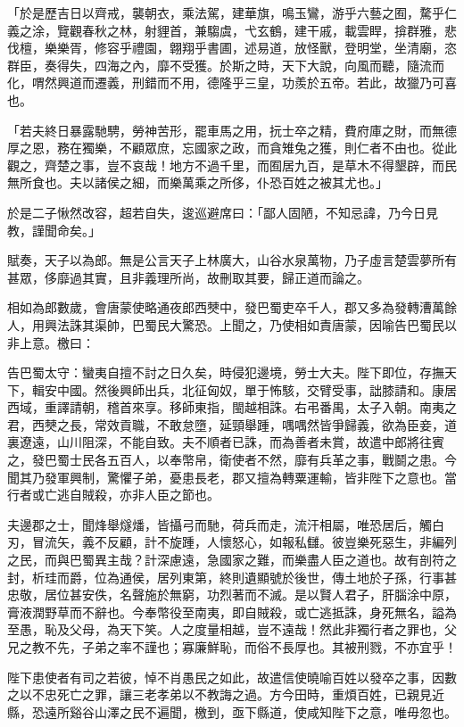 \begin{pinyinscope}
「於是歷吉日以齊戒，襲朝衣，乘法駕，建華旗，鳴玉鸞，游乎六藝之囿，騖乎仁義之涂，覽觀春秋之林，射貍首，兼騶虞，弋玄鶴，建干戚，載雲睅，揜群雅，悲伐檀，樂樂胥，修容乎禮園，翺翔乎書圃，述易道，放怪獸，登明堂，坐清廟，恣群臣，奏得失，四海之內，靡不受獲。於斯之時，天下大說，向風而聽，隨流而化，喟然興道而遷義，刑錯而不用，德隆乎三皇，功羨於五帝。若此，故獵乃可喜也。

「若夫終日暴露馳騁，勞神苦形，罷車馬之用，抏士卒之精，費府庫之財，而無德厚之恩，務在獨樂，不顧眾庶，忘國家之政，而貪雉兔之獲，則仁者不由也。從此觀之，齊楚之事，豈不哀哉！地方不過千里，而囿居九百，是草木不得墾辟，而民無所食也。夫以諸侯之細，而樂萬乘之所侈，仆恐百姓之被其尤也。」

於是二子愀然改容，超若自失，逡巡避席曰：「鄙人固陋，不知忌諱，乃今日見教，謹聞命矣。」

賦奏，天子以為郎。無是公言天子上林廣大，山谷水泉萬物，乃子虛言楚雲夢所有甚眾，侈靡過其實，且非義理所尚，故刪取其要，歸正道而論之。

相如為郎數歲，會唐蒙使略通夜郎西僰中，發巴蜀吏卒千人，郡又多為發轉漕萬餘人，用興法誅其渠帥，巴蜀民大驚恐。上聞之，乃使相如責唐蒙，因喻告巴蜀民以非上意。檄曰：

告巴蜀太守：蠻夷自擅不討之日久矣，時侵犯邊境，勞士大夫。陛下即位，存撫天下，輯安中國。然後興師出兵，北征匈奴，單于怖駭，交臂受事，詘膝請和。康居西域，重譯請朝，稽首來享。移師東指，閩越相誅。右弔番禺，太子入朝。南夷之君，西僰之長，常效貢職，不敢怠墮，延頸舉踵，喁喁然皆爭歸義，欲為臣妾，道裏遼遠，山川阻深，不能自致。夫不順者已誅，而為善者未賞，故遣中郎將往賓之，發巴蜀士民各五百人，以奉幣帛，衛使者不然，靡有兵革之事，戰鬬之患。今聞其乃發軍興制，驚懼子弟，憂患長老，郡又擅為轉粟運輸，皆非陛下之意也。當行者或亡逃自賊殺，亦非人臣之節也。

夫邊郡之士，聞烽舉燧燔，皆攝弓而馳，荷兵而走，流汗相屬，唯恐居后，觸白刃，冒流矢，義不反顧，計不旋踵，人懷怒心，如報私讎。彼豈樂死惡生，非編列之民，而與巴蜀異主哉？計深慮遠，急國家之難，而樂盡人臣之道也。故有剖符之封，析珪而爵，位為通侯，居列東第，終則遺顯號於後世，傳土地於子孫，行事甚忠敬，居位甚安佚，名聲施於無窮，功烈著而不滅。是以賢人君子，肝腦涂中原，膏液潤野草而不辭也。今奉幣役至南夷，即自賊殺，或亡逃抵誅，身死無名，謚為至愚，恥及父母，為天下笑。人之度量相越，豈不遠哉！然此非獨行者之罪也，父兄之教不先，子弟之率不謹也；寡廉鮮恥，而俗不長厚也。其被刑戮，不亦宜乎！

陛下患使者有司之若彼，悼不肖愚民之如此，故遣信使曉喻百姓以發卒之事，因數之以不忠死亡之罪，讓三老孝弟以不教誨之過。方今田時，重煩百姓，已親見近縣，恐遠所谿谷山澤之民不遍聞，檄到，亟下縣道，使咸知陛下之意，唯毋忽也。


\end{pinyinscope}
